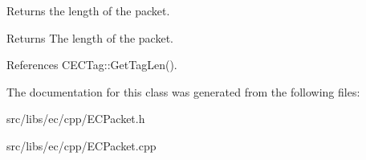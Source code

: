 Returns the length of the packet. \begin{DoxyReturn}{Returns}
The length of the packet. 
\end{DoxyReturn}


References CECTag::GetTagLen().

The documentation for this class was generated from the following files:\begin{DoxyCompactItemize}
\item 
src/libs/ec/cpp/ECPacket.h\item 
src/libs/ec/cpp/ECPacket.cpp\end{DoxyCompactItemize}

